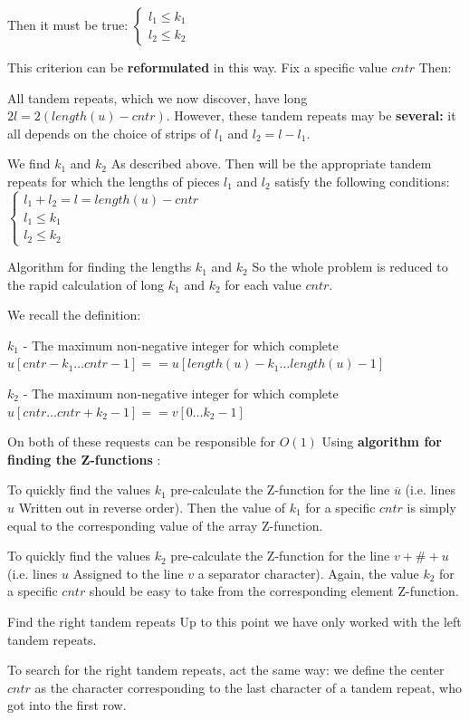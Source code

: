 Then it must be true:
$\begin{cases}
l_{1}\leq k_{1}\\
l_{2}\leq k_{2}
\end{cases}$

This criterion can be \textbf{reformulated} in this way. Fix a specific value $cntr$ Then:

All tandem repeats, which we now discover, have long $2 l = 2 (length (u) - cntr)$.
However, these tandem repeats may be \textbf{several:} it all depends on the choice of strips of $l_1$ and $l_2 = l - l_1$.

We find $k_1$ and $k_2$ As described above.
Then will be the appropriate tandem repeats for which the lengths of pieces $l_1$ and $l_2$ satisfy the following conditions:
$\begin{cases}
l_{1}+l_{2}=l=length(u)-cntr\\
l_{1}\leq k_{1}\\
l_{2}\leq k_{2}
\end{cases}$

Algorithm for finding the lengths $k_1$ and $k_2$
So the whole problem is reduced to the rapid calculation of long $k_1$ and $k_2$ for each value $cntr$.

We recall the definition:

$k_1$ - The maximum non-negative integer for which complete
$u[cntr-k_{1}\ldots cntr-1]==u[length(u)-k_{1}\ldots length(u)-1]$

$k_2$ - The maximum non-negative integer for which complete
$u[cntr\ldots cntr+k_{2}-1]==v[0\ldots k_{2}-1]$

On both of these requests can be responsible for $O (1)$ Using \textbf{algorithm for finding the Z-functions} :

To quickly find the values $k_1$ pre-calculate the Z-function for the line $\overline {u}$ (i.e. lines $u$ Written out in reverse order).
Then the value of $k_1$ for a specific $cntr$ is simply equal to the corresponding value of the array Z-function.

To quickly find the values $k_2$ pre-calculate the Z-function for the line $v + \# + u$ (i.e. lines $u$ Assigned to the line $v$ a separator character).
Again, the value $k_2$ for a specific $cntr$ should be easy to take from the corresponding element Z-function.

Find the right tandem repeats
Up to this point we have only worked with the left tandem repeats.

To search for the right tandem repeats, act the same way: we define the center $cntr$ as the character corresponding to the last character of a tandem repeat, who got into the first row.

